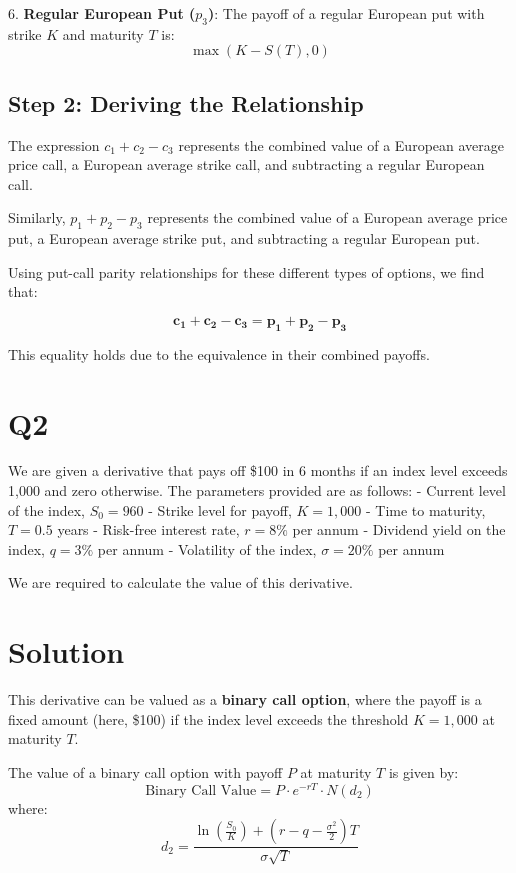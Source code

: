 \documentclass{article}
\begin{document}
6. \textbf{Regular European Put (\( p_3 \))}:  
   The payoff of a regular European put with strike \( K \) and maturity \( T \) is:
   \[
   \max(K - S(T), 0)
   \]

\subsection{\textbf{Step 2: Deriving the Relationship}}

The expression \( c_1 + c_2 - c_3 \) represents the combined value of a European average price call, a European average strike call, and subtracting a regular European call.

Similarly, \( p_1 + p_2 - p_3 \) represents the combined value of a European average price put, a European average strike put, and subtracting a regular European put.

Using put-call parity relationships for these different types of options, we find that:

\[
\boldsymbol{c_1 + c_2 - c_3 = p_1 + p_2 - p_3}
\]

This equality holds due to the equivalence in their combined payoffs.



\newpage


\section*{\textbf{Q2}}

We are given a derivative that pays off \$100 in 6 months if an index level exceeds 1,000 and zero otherwise. The parameters provided are as follows:
- Current level of the index, \( S_0 = 960 \)
- Strike level for payoff, \( K = 1,000 \)
- Time to maturity, \( T = 0.5 \) years
- Risk-free interest rate, \( r = 8\% \) per annum
- Dividend yield on the index, \( q = 3\% \) per annum
- Volatility of the index, \( \sigma = 20\% \) per annum

We are required to calculate the value of this derivative.

\section{\textbf{Solution}}

This derivative can be valued as a \textbf{binary call option}, where the payoff is a fixed amount (here, \$100) if the index level exceeds the threshold \( K = 1,000 \) at maturity \( T \).

The value of a binary call option with payoff \( P \) at maturity \( T \) is given by:
\[
\text{Binary Call Value} = P \cdot e^{-rT} \cdot N(d_2)
\]
where:
\[
d_2 = \frac{\ln\left(\frac{S_0}{K}\right) + \left(r - q - \frac{\sigma^2}{2}\right)T}{\sigma \sqrt{T}}
\]
\end{document}

